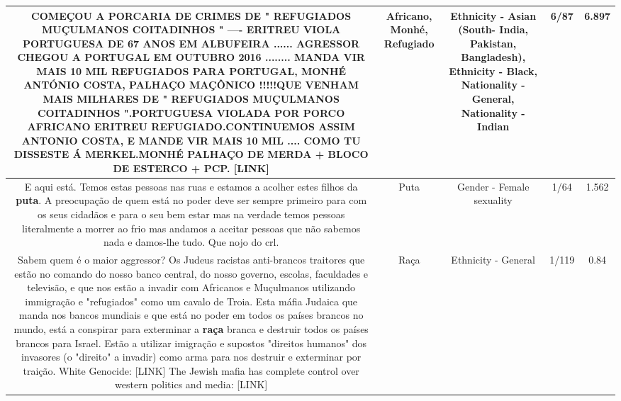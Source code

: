 \documentclass[11pt]{article}
\newlength\mylength
\begin{document}
\begin{center}
\begin{longtable}{|C{.65\mylength}|C{.30\mylength}|C{.12\mylength}|C{.12\mylength}|C{.12\mylength}|}
  \small COMEÇOU A PORCARIA DE CRIMES DE " REFUGIADOS MUÇULMANOS COITADINHOS " ---- ERITREU VIOLA PORTUGUESA DE 67 ANOS EM ALBUFEIRA ...... AGRESSOR CHEGOU A PORTUGAL EM OUTUBRO 2016 ........ MANDA VIR MAIS 10 MIL REFUGIADOS PARA PORTUGAL, \textbf{M\textbf{ONHÉ}} ANTÓNIO COSTA, PALHAÇO MAÇÔNICO !!!!!QUE VENHAM MAIS MILHARES DE " REFUGIADOS MUÇULMANOS COITADINHOS ".PORTUGUESA VIOLADA POR PORCO \textbf{AFRICANO} ERITREU \textbf{REFUGIADO}.CONTINUEMOS ASSIM ANTONIO COSTA, E MANDE VIR MAIS 10 MIL .... COMO TU DISSESTE Á MERKEL.\textbf{M\textbf{ONHÉ}} PALHAÇO DE MERDA + BLOCO DE ESTERCO + PCP. [LINK] \normalsize   & Africano, Monhé, Refugiado & Ethnicity - Asian (South- India, Pakistan, Bangladesh), Ethnicity - Black, Nationality - General, Nationality - Indian & 6/87 & 6.897 \\  \hline
  \small E aqui está. Temos estas pessoas nas ruas e estamos a acolher estes filhos da \textbf{puta}. A preocupação de quem está no poder deve ser sempre primeiro para com os seus cidadãos e para o seu bem estar mas na verdade temos pessoas literalmente a morrer ao frio mas andamos a aceitar pessoas que não sabemos nada e damos-lhe tudo. Que nojo do crl.\normalsize   & Puta & Gender - Female sexuality & 1/64 & 1.562 \\  \hline
  \small Sabem quem é o maior aggressor? Os Judeus racistas anti-brancos traitores que estão no comando do nosso banco central, do nosso governo, escolas, faculdades e televisão, e que nos estão a invadir com Africanos e Muçulmanos utilizando immigração e "refugiados" como um cavalo de Troia. Esta máfia Judaica que manda nos bancos mundiais e que está no poder em todos os países brancos no mundo, está a conspirar para exterminar a \textbf{raça} branca e destruir todos os países brancos para Israel. Estão a utilizar imigração e supostos "direitos humanos" dos invasores (o "direito" a invadir) como arma para nos destruir e exterminar por traição. White Genocide:  [LINK] The Jewish mafia has complete control over western politics and media:  [LINK] \normalsize   & Raça & Ethnicity - General & 1/119 & 0.84 \\  \hline

\end{longtable}
\end{center}
\end{document}
